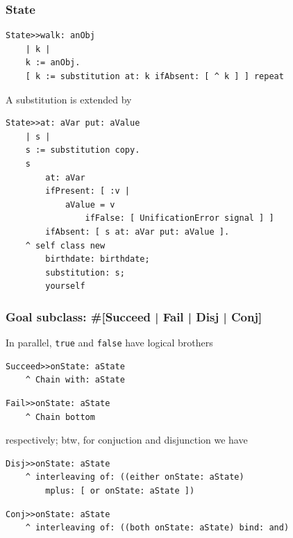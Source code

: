 \documentclass[9pt]{beamer}
\begin{document}
\begin{frame}[fragile]
\frametitle{State}
\begin{verbatim}
State>>walk: anObj
    | k |
    k := anObj.
    [ k := substitution at: k ifAbsent: [ ^ k ] ] repeat
\end{verbatim}
A substitution is extended by
\begin{verbatim}
State>>at: aVar put: aValue
    | s |
    s := substitution copy.
    s
        at: aVar
        ifPresent: [ :v |
            aValue = v
                ifFalse: [ UnificationError signal ] ]
        ifAbsent: [ s at: aVar put: aValue ].
    ^ self class new
        birthdate: birthdate;
        substitution: s;
        yourself
\end{verbatim}
\end{frame}

\begin{frame}[fragile]
\frametitle{Goal subclass: \#[Succeed | Fail | Disj | Conj]}
In parallel, \texttt{true} and \texttt{false} have logical brothers
\begin{verbatim}
Succeed>>onState: aState
    ^ Chain with: aState
\end{verbatim}
\begin{verbatim}
Fail>>onState: aState
    ^ Chain bottom
\end{verbatim}
respectively; btw, for conjuction and disjunction we have
\begin{verbatim}
Disj>>onState: aState
    ^ interleaving of: ((either onState: aState)
        mplus: [ or onState: aState ])
\end{verbatim}
\begin{verbatim}
Conj>>onState: aState
    ^ interleaving of: ((both onState: aState) bind: and)
\end{verbatim}
\end{frame}
\end{document}
